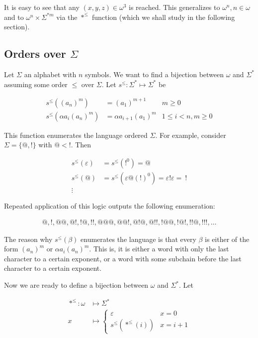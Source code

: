 \documentclass[a4paper, 12pt]{article}
\begin{document}
It is easy to see that any $(x, y, z) \in \omega^3$ is reached. This generalizes
to $\omega^n, n \in \omega$ and to $\omega^{n} \times \Sigma^{*m} $ via the
$*^{\leq}$ function (which we shall study in the following section).

\subsection{Orders over $\Sigma$}

Let $\Sigma$ an alphabet with $n$ symbols. We want to find a bijection between $\omega$ and
$\Sigma^{*}$ assuming some order $\leq$ over $\Sigma$. Let $s^{\leq} :
\Sigma^{*} \mapsto \Sigma^{*}$ be


\begin{align*}
    s^{\leq} \left( (a_n)^m \right)  &= (a_1)^{m + 1} & m \geq 0\\ 
    s^{\leq} \left( \alpha a_i (a_n)^{m} \right) &= \alpha a_{i+1} (a_1)^{m} & 1
    \leq i < n, m \geq 0
\end{align*}

This function enumerates the language ordered $\Sigma$. For example, consider
$\Sigma = \{@, !\}$ with $@ < !$. Then 

\begin{align*}
    s^{\leq}( \varepsilon ) &= s^{\leq}( !^{0} ) = @\\
    s^{\leq}( @ ) &= s^{\leq}( \varepsilon @ (!)^{0} ) = \varepsilon ! \varepsilon = ~!
    \\ 
    \vdots
\end{align*}

Repeated application of this logic outputs the following enumeration: 

\begin{align*}
    @, !, @@, @!, !@, !!, @@@, @@!, @!@, @!!, !@@, !@!, !!@, !!!, \ldots
\end{align*}

The reason why $s^{\leq}( \beta  )$ enumerates the language is that every $\beta
$ is either of the form $(a_n)^{m}$ or $\alpha a_i (a_n)^{m}$. This is, it is
either a word with only the last character to a certain exponent, or a word with
some subchain before the last character to a certain exponent.

Now we are ready to define a bijection between $\omega$ and $\Sigma^{*}$. Let 

\begin{align*}
    *^{\leq} : \omega &\mapsto \Sigma^{*} \\ 
    x &\mapsto \begin{cases}
        \varepsilon & x = 0 \\ 
        s^{\leq} \left( *^{\leq} \left( i \right)  \right) & x = i + 1
    \end{cases}
\end{align*}
\end{document}
